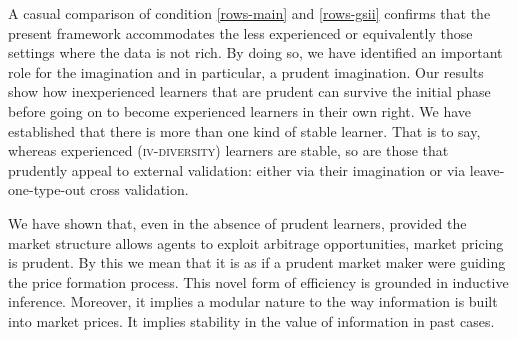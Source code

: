 \documentclass[ecta,nameyear,draft]{econsocart}
\newcommand{\fourdiv}{\textsc{iv}-\textsc{diversity}}
\theoremstyle{plain}
\theoremstyle{remark}
\begin{document}
A casual comparison of condition \ref{rows-main} and \ref{rows-gsii} confirms
that the present framework accommodates the less experienced or equivalently
those settings where the data is not rich.  By doing so, we have identified an
important role for the imagination and in particular, a prudent imagination.
Our results show how inexperienced learners that are prudent can survive the
initial phase before going on to become experienced learners in their own
right. We have established that there is more than one kind of stable learner.
That is to say, whereas experienced (\fourdiv) learners are stable, so are
those that prudently appeal to external validation: either via their
imagination or via leave-one-type-out cross validation.

We have shown that, even in the absence of prudent learners, provided the
market structure allows agents to exploit arbitrage opportunities, market
pricing is prudent. By this we mean that it is as if a prudent market maker
were guiding the price formation process. This novel form of efficiency is
grounded in inductive inference. Moreover, it implies a modular nature to the
way information is built into market prices. It implies stability in the value
of information in past cases. 
\end{document}
